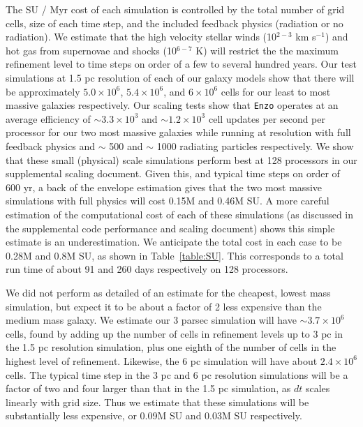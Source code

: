 \documentclass[11pt]{article}
\begin{document}
The SU / Myr cost of each simulation is controlled by the total number of grid cells, size of each time step, and the included feedback physics (radiation or no radiation). We estimate that the high velocity stellar winds (10$^{2-3}$ km s$^{-1}$) and hot gas from supernovae and shocks (10$^{6-7}$ K) will restrict the the maximum refinement level to time steps on order of a few to several hundred years. Our test simulations at 1.5 pc resolution of each of our galaxy models show that there will be approximately $5.0 \times 10^{6}$, $5.4 \times 10^{6}$, and $6 \times 10^{6}$ cells for our least to most massive galaxies respectively. Our scaling tests show that \texttt{Enzo} operates at an average efficiency of $\sim 3.3\times 10^{3}$ and $\sim 1.2\times 10^{3}$ cell updates per second per processor for our two most massive galaxies while running at resolution with full feedback physics and $\sim$ 500 and $\sim$ 1000 radiating particles respectively. We show that these small (physical) scale simulations perform best at 128 processors in our supplemental scaling document. Given this, and typical time steps on order of 600 yr, a back of the envelope estimation gives that the two most massive simulations with full physics will cost 0.15M and 0.46M SU. A more careful estimation of the computational cost of each of these simulations (as discussed in the supplemental code performance and scaling document) shows this simple estimate is an underestimation. We anticipate the total cost in each case to be 0.28M and 0.8M SU, as shown in Table~\ref{table:SU}. This corresponds to a total run time of about 91 and 260 days respectively on 128 processors. 

We did not perform as detailed of an estimate for the cheapest, lowest mass simulation, but expect it to be about a factor of 2 less expensive than the medium mass galaxy. We estimate our 3 parsec simulation will have $\sim 3.7 \times 10^{6}$ cells, found by adding up the number of cells in refinement levels up to 3 pc in the 1.5 pc resolution simulation, plus one eighth of the number of cells in the highest level of refinement. Likewise, the 6 pc simulation will have about $2.4 \times 10^{6}$ cells. The typical time step in the 3 pc and 6 pc resolution simulations will be a factor of two and four larger than that in the 1.5 pc simulation, as $dt$ scales linearly with grid size. Thus we estimate that these simulations will be substantially less expensive, or 0.09M SU and 0.03M SU respectively.
\end{document}
